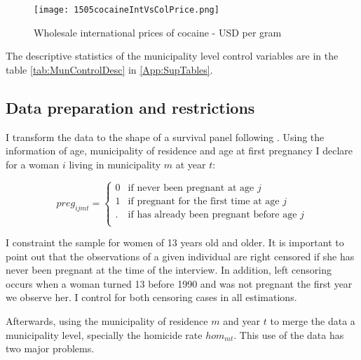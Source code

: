 \documentclass[a4paper,10pt,twocolumn,preprint,3p,authoryear]{elsarticle}
\begin{document}
\begin{figure}[h]
	\centering
	\texttt{[image: 1505cocaineIntVsColPrice.png]}
	 \begin{minipage}[t]{2\columnwidth}%
		  \begin{spacing}{1}
		  \end{spacing}
	  \end{minipage}
	\caption{Wholesale international prices of cocaine - USD per gram}
	\label{fig:CocaineWSPrices}
\end{figure}

The descriptive statistics of the municipality level control variables are in the table \ref{tab:MunControlDesc} in \ref{App:SupTables}.

\subsection{Data preparation and restrictions} 

I transform the data to the shape of a survival panel following \citet{Jenkins2005}. Using the information of age, municipality of residence and age at first pregnancy I declare for a woman $i$ living in municipality $m$ at year $t$:

\begin{equation}
	preg_{ijmt} = \left\{
		\begin{array}{ll}
		   0	& \text{if never been pregnant at age } j \\
		   1	& \text{if pregnant for the first time at age } j \\
		   .	& \text{if has already been pregnant before age } j \\
	   \end{array}	
		\right.
	\label{eq:preg}
\end{equation}

I constraint the sample for women of 13 years old and older. It is important to point out that the observations of a given individual are right censored if she has never been pregnant at the time of the interview. In addition, left censoring occurs when a woman turned 13 before 1990 and was not pregnant the first year we observe her. I control for both censoring cases in all estimations.

Afterwards, using the municipality of residence $m$ and year $t$ to merge the data a municipality level, specially the homicide rate $hom_{mt}$. This use of the data has two major problems. 
\end{document}
